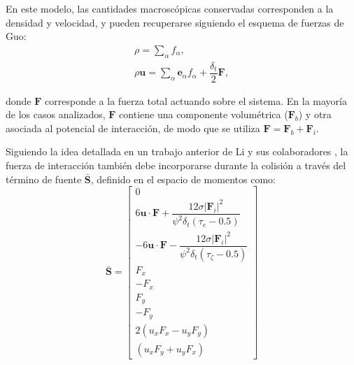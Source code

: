 En este modelo, las cantidades macrosc\'opicas conservadas corresponden a la densidad y velocidad, y pueden recuperarse siguiendo el esquema de fuerzas de Guo:
\begin{equation}
	\begin{gathered}
		\rho = \sum_{\alpha} f_{\alpha}, \\
		\rho \bm{u} = \sum_{\alpha} \bm{e}_{\alpha} f_{\alpha} + \dfrac{\delta_t}{2} \bm{F},
	\end{gathered}
\end{equation}

donde $\bm{F}$ corresponde a la fuerza total actuando sobre el sistema. En la mayor\'ia de los casos analizados, $\bm{F}$ contiene una componente volum\'etrica ($\bm{F}_b$) y otra asociada al potencial de interacci\'on, de modo que se utiliza $\bm{F} = \bm{F}_b + \bm{F}_i$.

Siguiendo la idea detallada en un trabajo anterior de Li y sus colaboradores \cite{li_forcing_2012}, la fuerza de interacci\'on tambi\'en debe incorporarse durante la colisi\'on a trav\'es del t\'ermino de fuente $\bar{\bm{S}}$, definido en el espacio de momentos como:
\begin{equation}
 \bar{\bm{S}} = 
 \left[ 
 	\begin{array}{c} 
 		0	\\
 		6 \bm{u} \cdot \bm{F} + \dfrac{12\sigma |\bm{F}_i|^2}{\psi^2 \delta_t (\tau_e-0.5)} \\
 		-6 \bm{u} \cdot \bm{F} - \dfrac{12\sigma |\bm{F}_i|^2}{\psi^2 \delta_t (\tau_{\zeta}-0.5)} \\
 		F_x \\
 		-F_x \\
 		F_y \\
 		-F_y \\
 		2(u_xF_x - u_yF_y) \\
 		(u_xF_y + u_yF_x)
 	\end{array} 
 \right]
 \label{eq:s_li}
\end{equation}

